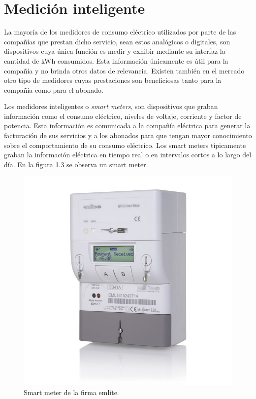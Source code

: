 
\section{Medición inteligente}

La mayoría de los medidores de consumo eléctrico utilizados por parte de las compañías que prestan dicho servicio, sean estos analógicos o digitales, son dispositivos cuya única función es medir y exhibir mediante su interfaz la cantidad de kWh consumidos. Esta información únicamente es útil para la compañía y no brinda otros datos de relevancia. Existen también en el mercado otro tipo de medidores cuyas prestaciones son beneficiosas tanto para la compañía como para el abonado.

Los medidores inteligentes o \textit{smart meters}, son dispositivos que graban información como el consumo eléctrico, niveles de voltaje, corriente y factor de potencia. Esta información es comunicada a la compañía eléctrica para generar la facturación de sus servicios y a los abonados para que tengan mayor conocimiento sobre el comportamiento de su consumo eléctrico. Los smart meters típicamente graban la información eléctrica en tiempo real o en intervalos cortos a lo largo del día. En la figura 1.3 se observa un smart meter.

\begin{figure}[h]
	\centering
	\includegraphics[scale=0.29]{./Figures/smart_meter.jpg}
	\caption{Smart meter de la firma emlite\protect\footnotemark.}
	\label{fig:smartMeter}
\end{figure}


